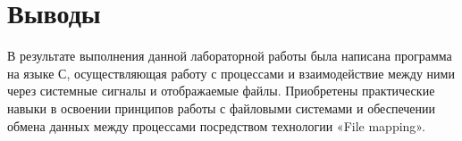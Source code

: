 \documentclass[a4paper, 12pt]{article}
\begin{document}
\section{Выводы}

В результате выполнения данной лабораторной работы была написана программа на языке С, осуществляющая работу с процессами и взаимодействие между ними через системные сигналы и отображаемые файлы. Приобретены практические навыки в освоении принципов работы с файловыми системами и обеспечении обмена данных между процессами посредством технологии «File mapping».
\end{document}
